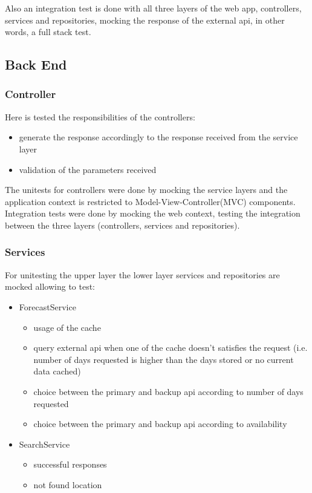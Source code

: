 \documentclass[12pt]{article}
\begin{document}
Also an integration test is done with all three layers of the web app, controllers,
  services and repositories, mocking the response of the external api, in other words,
  a full stack test.

\subsection{Back End}
\subsubsection{Controller}

Here is tested the responsibilities of the controllers:
\begin{itemize}
  \item generate the response accordingly to the response received from the service layer
  \item validation of the parameters received
\end{itemize}
The unitests for controllers were done by mocking the service layers and the application
  context is restricted to Model-View-Controller(MVC) components. Integration tests were done
  by mocking the web context, testing the integration between the three layers (controllers,
  services and repositories).

\subsubsection{Services}

For unitesting the upper layer the lower layer services and repositories are mocked allowing
  to test:
\begin{itemize}
  \item ForecastService
    \begin{itemize}
      \item usage of the cache
      \item query external api when one of the cache doesn't satisfies the request (i.e.
        number of days requested is higher than the days stored or no current data
        cached)
      \item choice between the primary and backup api according to number of days requested
      \item choice between the primary and backup api according to availability
    \end{itemize}
  \item SearchService
    \begin{itemize}
      \item successful responses
      \item not found location
    \end{itemize}
\end{itemize}
\end{document}
